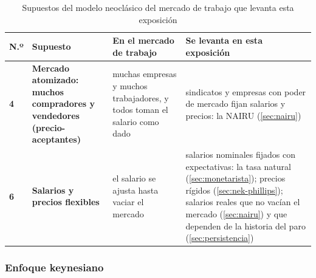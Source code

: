 \documentclass[11pt]{article}
\begin{document}
\begin{table}[H]
\centering
\caption{Supuestos del modelo neoclásico del mercado de trabajo que levanta esta exposición}\label{tab:supuestos-trabajo}
\small
\begin{tabular}{>{\centering\arraybackslash}m{0.6cm}>{\raggedright\arraybackslash}m{3.6cm}>{\raggedright\arraybackslash}m{4.6cm}>{\raggedright\arraybackslash}m{5.4cm}}
\toprule
\rowcolor{tceeazulpalido}\textbf{N.º} & \textbf{Supuesto} & \textbf{En el mercado de trabajo} & \textbf{Se levanta en esta exposición}\\
\midrule
\textcolor{tceemorado}{\textbf{4}} & \textbf{Mercado atomizado: muchos compradores y vendedores (precio-aceptantes)} & muchas empresas y muchos trabajadores, y todos toman el salario como dado & sindicatos y empresas con poder de mercado fijan salarios y precios: la NAIRU (\ref{sec:nairu})\\
\addlinespace[0.3em]
\textcolor{tceemorado}{\textbf{6}} & \textbf{Salarios y precios flexibles} & el salario se ajusta hasta vaciar el mercado & salarios nominales fijados con expectativas: la tasa natural (\ref{sec:monetarista}); precios rígidos (\ref{sec:nek-phillips}); salarios reales que no vacían el mercado (\ref{sec:nairu}) y que dependen de la historia del paro (\ref{sec:persistencia})\\
\bottomrule
\end{tabular}
\end{table}

\subsubsection{Enfoque keynesiano}\label{sec:keynesiano}
\end{document}
